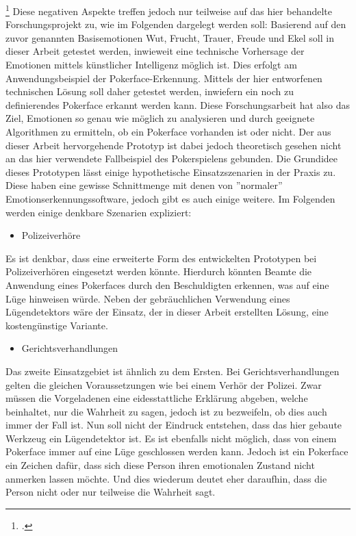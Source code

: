 \documentclass[12pt, a4paper]{report}
\begin{document}
\footcite[Vgl.][Ergebnis]{Frauenhofer}
Diese negativen Aspekte treffen jedoch nur teilweise auf das hier behandelte Forschungsprojekt zu, wie im Folgenden dargelegt werden soll:
Basierend auf den zuvor genannten Basisemotionen Wut, Frucht, Trauer, Freude und Ekel soll in dieser Arbeit getestet werden, inwieweit eine technische Vorhersage der Emotionen mittels künstlicher Intelligenz möglich ist. Dies erfolgt am Anwendungsbeispiel der Pokerface-Erkennung. Mittels der hier entworfenen technischen Lösung soll daher getestet werden, inwiefern ein noch zu definierendes Pokerface erkannt werden kann. Diese Forschungsarbeit hat also das Ziel, Emotionen so genau wie möglich zu analysieren und durch geeignete Algorithmen zu ermitteln, ob ein Pokerface vorhanden ist oder nicht. Der aus dieser Arbeit hervorgehende Prototyp ist dabei jedoch theoretisch gesehen nicht an das hier verwendete Fallbeispiel des Pokerspielens gebunden. Die Grundidee dieses Prototypen lässt einige hypothetische Einsatzszenarien in der Praxis zu. Diese haben eine gewisse Schnittmenge mit denen von ''normaler'' Emotionserkennungssoftware, jedoch gibt es auch einige weitere. Im Folgenden werden
einige denkbare Szenarien expliziert:
\begin{itemize}
	\item{Polizeiverhöre}
\end{itemize}
Es ist denkbar, dass eine erweiterte Form des entwickelten Prototypen bei Polizeiverhören eingesetzt werden könnte. Hierdurch könnten Beamte die Anwendung eines Pokerfaces durch den Beschuldigten erkennen, was auf eine Lüge hinweisen würde. Neben der gebräuchlichen Verwendung eines Lügendetektors wäre der Einsatz, der in dieser Arbeit erstellten Lösung, eine kostengünstige Variante.
\begin{itemize}
	\item{Gerichtsverhandlungen}
\end{itemize}
Das zweite Einsatzgebiet ist ähnlich zu dem Ersten. Bei Gerichtsverhandlungen gelten die gleichen Voraussetzungen wie bei einem Verhör der Polizei. Zwar müssen die Vorgeladenen eine eidesstattliche Erklärung abgeben, welche beinhaltet, nur die Wahrheit zu sagen, jedoch ist zu bezweifeln, ob dies auch immer der Fall ist.
Nun soll nicht der Eindruck entstehen, dass das hier gebaute Werkzeug ein Lügendetektor ist. Es ist ebenfalls nicht möglich, dass von einem Pokerface immer auf eine Lüge geschlossen werden kann. Jedoch ist ein Pokerface ein Zeichen dafür, dass sich diese Person ihren emotionalen Zustand nicht anmerken lassen möchte. Und dies wiederum deutet eher daraufhin, dass die Person nicht oder nur teilweise die Wahrheit sagt.
\end{document}
